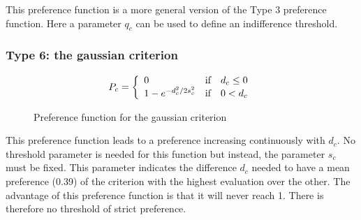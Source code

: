 This preference function is a more general version of the Type 3 preference function. Here a parameter $q_c$ can be used to define an indifference threshold.

\subsubsection{Type 6: the gaussian criterion}
\begin{figure}[H]
\begin{minipage}{.4\textwidth}
    \begin{center}
    \end{center}
\end{minipage}%
\begin{minipage}{.6\textwidth}
    \begin{equation}
        P_c = \left\{
            \begin{array}{l l c}
                0                            & \text{if}  & d_{c} \le 0 \\
                1-e^{-d_c^2/2s_c^2} & \text{if}  & 0 < d_c  \\
            \end{array}
            \right .
            \label{eq:type6_criterion}
    \end{equation}
\end{minipage}
\caption{ Preference function for the gaussian criterion}
\end{figure}

This preference function leads to a preference increasing continuously with $d_c$. No threshold parameter is needed for this function but instead, the parameter $s_c$ must be fixed. This parameter indicates the difference $d_c$ needed to have a mean preference (0.39) of the criterion with the highest evaluation over the other.
The advantage of this preference function is that it will never reach 1. There is therefore no threshold of strict preference.


